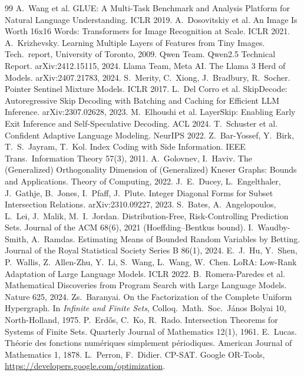 \begin{thebibliography}{99}
 A.~Wang et al. GLUE: A Multi-Task Benchmark and Analysis Platform for Natural Language Understanding. ICLR 2019.
 A.~Dosovitskiy et al. An Image Is Worth 16x16 Words: Transformers for Image Recognition at Scale. ICLR 2021.
 A.~Krizhevsky. Learning Multiple Layers of Features from Tiny Images. Tech.\ report, University of Toronto, 2009.
 Qwen Team. Qwen2.5 Technical Report. arXiv:2412.15115, 2024.
 Llama Team, Meta AI. The Llama 3 Herd of Models. arXiv:2407.21783, 2024.
 S.~Merity, C.~Xiong, J.~Bradbury, R.~Socher. Pointer Sentinel Mixture Models. ICLR 2017.
 L.~Del Corro et al. SkipDecode: Autoregressive Skip Decoding with Batching and Caching for Efficient LLM Inference. arXiv:2307.02628, 2023.
 M.~Elhoushi et al. LayerSkip: Enabling Early Exit Inference and Self-Speculative Decoding. ACL 2024.
 T.~Schuster et al. Confident Adaptive Language Modeling. NeurIPS 2022.
 Z.~Bar-Yossef, Y.~Birk, T.~S.~Jayram, T.~Kol. Index Coding with Side Information. IEEE Trans.\ Information Theory 57(3), 2011.
 A.~Golovnev, I.~Haviv. The (Generalized) Orthogonality Dimension of (Generalized) Kneser Graphs: Bounds and Applications. Theory of Computing, 2022.
 J.~E.~Ducey, L.~Engelthaler, J.~Gathje, B.~Jones, I.~Pfaff, J.~Plute. Integer Diagonal Forms for Subset Intersection Relations. arXiv:2310.09227, 2023.
 S.~Bates, A.~Angelopoulos, L.~Lei, J.~Malik, M.~I.~Jordan. Distribution-Free, Risk-Controlling Prediction Sets. Journal of the ACM 68(6), 2021 (Hoeffding--Bentkus bound).
 I.~Waudby-Smith, A.~Ramdas. Estimating Means of Bounded Random Variables by Betting. Journal of the Royal Statistical Society Series B 86(1), 2024.
 E.~J.~Hu, Y.~Shen, P.~Wallis, Z.~Allen-Zhu, Y.~Li, S.~Wang, L.~Wang, W.~Chen. LoRA: Low-Rank Adaptation of Large Language Models. ICLR 2022.
 B.~Romera-Paredes et al. Mathematical Discoveries from Program Search with Large Language Models. Nature 625, 2024.
 Zs.~Baranyai. On the Factorization of the Complete Uniform Hypergraph. In \emph{Infinite and Finite Sets}, Colloq.\ Math.\ Soc.\ J\'anos Bolyai 10, North-Holland, 1975.
 P.~Erd\H{o}s, C.~Ko, R.~Rado. Intersection Theorems for Systems of Finite Sets. Quarterly Journal of Mathematics 12(1), 1961.
 E.~Lucas. Th\'eorie des fonctions num\'eriques simplement p\'eriodiques. American Journal of Mathematics 1, 1878.
 L.~Perron, F.~Didier. CP-SAT. Google OR-Tools, \url{https://developers.google.com/optimization}.

\end{thebibliography}
